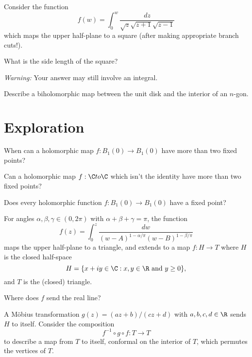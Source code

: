 \documentclass{homework}
\begin{document}
\begin{problem}
  Consider the function
  \[
    f(w) = \int_0^w  \frac{dz}{\sqrt{z} \sqrt{z+1} \sqrt{z-1}}
  \]
  which maps the upper half-plane to a square (after making appropriate branch cuts!).

  What is the side length of the square?

  \textit{Warning:} Your answer may still involve an integral.
\end{problem}

\begin{problem}
  Describe a biholomorphic map between the unit disk and the interior
  of an $n$-gon.
\end{problem}

\section{Exploration}

\begin{problem}  
  When can a holomorphic map $f : B_1(0) \to B_1(0)$ have more than two fixed points?
\end{problem}

\begin{problem}
  Can a holomorphic map $f : \C to \C$ which isn't the identity have
  more than two fixed points?
\end{problem}

\begin{problem}
  Does every holomorphic function $f : B_1(0) \to B_1(0)$ have a fixed point?
\end{problem}

\begin{problem}
  For angles $\alpha, \beta, \gamma \in (0,2\pi)$ with $\alpha + \beta + \gamma = \pi$, the function
  \[
    f(z) = \int_0^z \frac{dw}{(w-A)^{1-\alpha/\pi} (w-B)^{1-\beta/\pi}}
  \]
  maps the upper half-plane to a triangle, and extends to a map $f : H \to T$ where $H$ is the closed half-space
  \[
    H = \{ x + iy \in \C : x, y \in \R \mbox{ and } y \geq 0 \},
  \]
  and $T$ is the (closed) triangle.

  Where does $f$ send the real line?
\end{problem}

\begin{problem}
  A M\"obius transformation $g(z) = (az + b)/(cz + d)$ with
  $a,b,c,d \in \R$ sends $H$ to itself.  Consider the composition
  \[
    f^{-1} \circ g \circ f : T \to T
  \]
  to describe a map from $T$ to itself, conformal on the interior of
  $T$, which permutes the vertices of $T$.
\end{problem}
\end{document}
